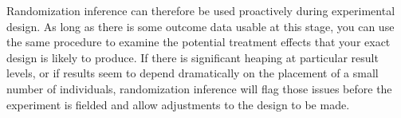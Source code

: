 Randomization inference can therefore be used proactively during experimental design.
As long as there is some outcome data usable at this stage,
you can use the same procedure to examine the potential treatment effects
that your exact design is likely to produce.
If there is significant heaping at particular result levels,
or if results seem to depend dramatically on the placement of a small number of individuals,
randomization inference will flag those issues before the experiment is fielded
and allow adjustments to the design to be made.

